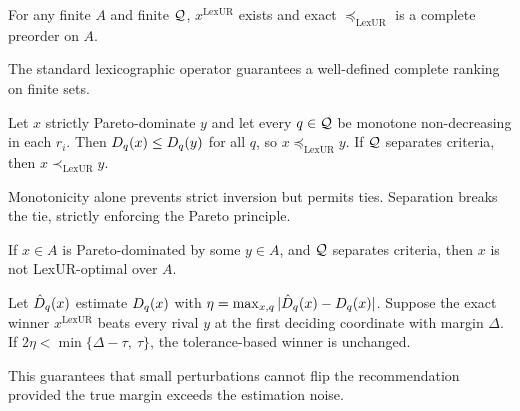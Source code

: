 \begin{theorem}
\label{thm:exist}
For any finite $A$ and finite $\mathcal{Q}$, $x^{\mathrm{LexUR}}$ exists and exact $\preceq_{\mathrm{LexUR}}$ is a complete preorder on $A$.
\end{theorem}
The standard lexicographic operator guarantees a well-defined complete ranking on finite sets.

\begin{theorem}
\label{thm:pareto}
Let $x$ strictly Pareto-dominate $y$ and let every $q\in\mathcal{Q}$ be monotone non-decreasing in each $r_i$. Then $D_q(x)\le D_q(y)$ for all $q$, so $x\preceq_{\mathrm{LexUR}}y$. If $\mathcal{Q}$ separates criteria, then $x\prec_{\mathrm{LexUR}}y$.
\end{theorem}
Monotonicity alone prevents strict inversion but permits ties. Separation breaks the tie, strictly enforcing the Pareto principle.

\begin{corollary}
\label{cor:dom}
If $x \in A$ is Pareto-dominated by some $y \in A$, and $\mathcal{Q}$ separates criteria, then $x$ is not LexUR-optimal over $A$.
\end{corollary}

\begin{theorem}
\label{thm:stab}
Let $\hat{D}_q(x)$ estimate $D_q(x)$ with $\eta=\max_{x,q}|\hat{D}_q(x)-D_q(x)|$. Suppose the exact winner $x^{\mathrm{LexUR}}$ beats every rival $y$ at the first deciding coordinate with margin $\Delta$. If $2\eta<\min\{\Delta-\tau,\ \tau\}$, the tolerance-based winner is unchanged.
\end{theorem}
This guarantees that small perturbations cannot flip the recommendation provided the true margin exceeds the estimation noise.
